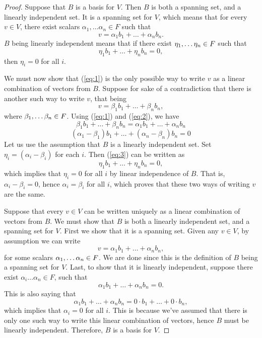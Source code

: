 \documentclass[11pt]{article}
\begin{document}
\begin{proof}
\necessary Suppose that $ B $ is a basis for $ V $. Then $ B $ is both a spanning set, and a linearly independent set. It is a spanning set for $ V $, which means that for every $ v \in V $, there exist scalars $ \alpha_{1}, \dots \alpha_{n} \in F $ such that 
\begin{equation} \label{eq:1}
	v = \alpha_{1} b_{1} + \dots + \alpha_{n} b_{n}.
\end{equation}
$ B $ being linearly independent means that if there exist $ \eta_{1}, \dots \eta_{n} \in F $ such that
\[ \eta_{1} b_{1} + \dots + \eta_{n} b_{n} = 0, \]
then  $ \eta_{i} = 0 $ for all $ i $.

We must now show that (\ref{eq:1}) is the only possible way to write $ v $ as a linear combination of vectors from $ B $. Suppose for sake of a contradiction that there is another such way to write $ v $, that being
\begin{equation} \label{eq:2}
	v = \beta_{1} b_{1} + \dots + \beta_{n} b_{n},	
\end{equation}
where $ \beta_{1}, \dots \beta_{n} \in F $. Using (\ref{eq:1}) and (\ref{eq:2}), we have
\[ \beta_{1} b_{1} + \dots + \beta_{n} b_{n} = \alpha_{1} b_{1} + \dots + \alpha_{n} b_{n} \]
\begin{equation} \label{eq:3}
	(\alpha_{1} - \beta_{1}) b_{1} + \dots + (\alpha_{n} - \beta_{n}) b_{n} = 0 
\end{equation}
Let us use the assumption that $ B $ is a linearly independent set. Set $ \eta_{i} = (\alpha_{i}-  \beta_{i}) $ for each $ i $. Then (\ref{eq:3}) can be written as 
\[ \eta_{1} b_{1} +  \dots + \eta_{n} b_{n} = 0, \]
which implies that $ \eta_{i} = 0 $ for all $ i $ by linear independence of $ B $. That is, $ \alpha_{i} - \beta_{i} = 0 $, hence $ \alpha_{i} = \beta_{i} $ for all $ i $, which proves that these two ways of writing $ v $ are the same.

\sufficient Suppose that every $ v \in V $ can be written uniquely as a linear combination of vectors from $ B $. We must show that $ B $ is both a linearly independent set, and a spanning set for $ V $. First we show that it is a spanning set. Given any $ v \in V $, by assumption we can write 
\[ v = \alpha_{1}b_{1} + \dots + \alpha_{n} b_{n}, \] 
for some scalars $ \alpha_{1}, \dots \alpha_{n} \in F $. We are done since this is the definition of $ B $ being a spanning set for $ V $. Last, to show that it is linearly independent, suppose there exist $ \alpha_{i} \dots \alpha_{n} \in F $, such that 
\[ \alpha_{1} b_{1} + \dots + \alpha_{n}b_{n} = 0. \]
This is also saying that 
\[ \alpha_{1} b_{1} + \dots + \alpha_{n}b_{n} = 0 \cdot b_{1} + \dots + 0 \cdot b_{n}, \]
which implies that $ \alpha_{i} = 0 $ for all $ i $. This is because we've assumed that there is only one such way to write this linear combination of vectors, hence $ B $ must be linearly independent. Therefore, $ B $ is a basis for $ V $.
\end{proof}
\end{document}
